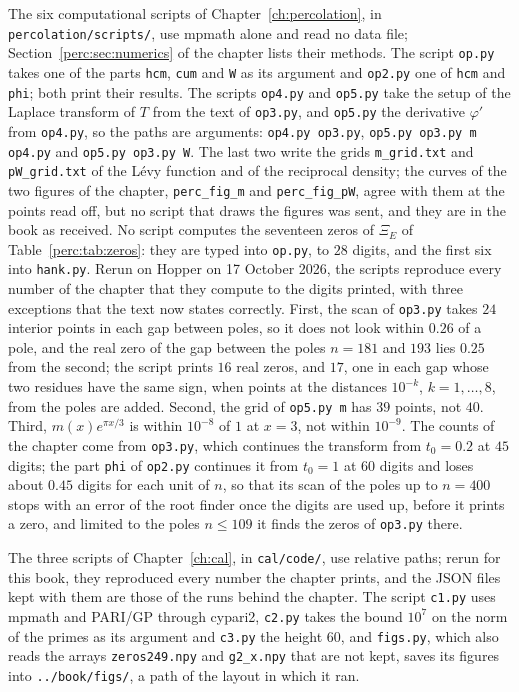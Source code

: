 The six computational scripts of Chapter~\ref{ch:percolation}, in \texttt{percolation/\allowbreak scripts/}, use mpmath alone and read no data file; Section~\ref{perc:sec:numerics} of the chapter lists their methods. The script \texttt{op.py} takes one of the parts \texttt{hcm}, \texttt{cum} and \texttt{W} as its argument and \texttt{op2.py} one of \texttt{hcm} and \texttt{phi}; both print their results. The scripts \texttt{op4.py} and \texttt{op5.py} take the setup of the Laplace transform of $T$ from the text of \texttt{op3.py}, and \texttt{op5.py} the derivative $\varphi'$ from \texttt{op4.py}, so the paths are arguments: \texttt{op4.py op3.py}, \texttt{op5.py op3.py m op4.py} and \texttt{op5.py op3.py W}. The last two write the grids \texttt{m\_grid.txt} and \texttt{pW\_grid.txt} of the L\'evy function and of the reciprocal density; the curves of the two figures of the chapter, \texttt{perc\_fig\_m} and \texttt{perc\_fig\_pW}, agree with them at the points read off, but no script that draws the figures was sent, and they are in the book as received. No script computes the seventeen zeros of $\Xi_E$ of Table~\ref{perc:tab:zeros}: they are typed into \texttt{op.py}, to $28$ digits, and the first six into \texttt{hank.py}. Rerun on Hopper on 17 October 2026, the scripts reproduce every number of the chapter that they compute to the digits printed, with three exceptions that the text now states correctly. First, the scan of \texttt{op3.py} takes $24$ interior points in each gap between poles, so it does not look within $0.26$ of a pole, and the real zero of the gap between the poles $n=181$ and $193$ lies $0.25$ from the second; the script prints $16$ real zeros, and $17$, one in each gap whose two residues have the same sign, when points at the distances $10^{-k}$, $k=1,\dots,8$, from the poles are added. Second, the grid of \texttt{op5.py m} has $39$ points, not $40$. Third, $m(x)e^{\pi x/3}$ is within $10^{-8}$ of $1$ at $x=3$, not within $10^{-9}$. The counts of the chapter come from \texttt{op3.py}, which continues the transform from $t_0=0.2$ at $45$ digits; the part \texttt{phi} of \texttt{op2.py} continues it from $t_0=1$ at $60$ digits and loses about $0.45$ digits for each unit of $n$, so that its scan of the poles up to $n=400$ stops with an error of the root finder once the digits are used up, before it prints a zero, and limited to the poles $n\le109$ it finds the zeros of \texttt{op3.py} there.

The three scripts of Chapter~\ref{ch:cal}, in \texttt{cal/code/}, use relative paths; rerun for this book, they reproduced every number the chapter prints, and the JSON files kept with them are those of the runs behind the chapter. The script \texttt{c1.py} uses mpmath and PARI/GP through cypari2, \texttt{c2.py} takes the bound $10^7$ on the norm of the primes as its argument and \texttt{c3.py} the height $60$, and \texttt{figs.py}, which also reads the arrays \texttt{zeros249.npy} and \texttt{g2\_x.npy} that are not kept, saves its figures into \texttt{../book/figs/}, a path of the layout in which it ran.

